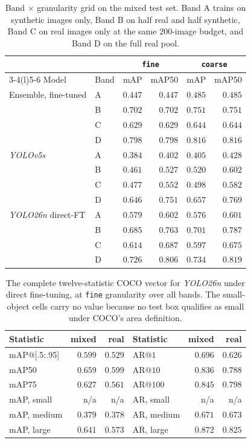 \begin{table}[htbp]
\centering
\caption[Band by granularity grid on the mixed test set]{Band $\times$ granularity grid on the mixed test set. Band A trains on synthetic images only, Band B on half real and half synthetic, Band C on real images only at the same $200$-image budget, and Band D on the full real pool.}
\label{tab:band-grid-mixed}
\small
\begin{tabular}{@{}llrrrr@{}}
\toprule
 & & \multicolumn{2}{c}{\texttt{fine}} & \multicolumn{2}{c}{\texttt{coarse}} \\
\cmidrule(l){3-4}\cmidrule(l){5-6}
Model & Band & mAP & mAP50 & mAP & mAP50 \\
\midrule
Ensemble, fine-tuned & A & $0.447$ & $0.447$ & $0.485$ & $0.485$ \\
 & B & $0.702$ & $0.702$ & $0.751$ & $0.751$ \\
 & C & $0.629$ & $0.629$ & $0.644$ & $0.644$ \\
 & D & $0.798$ & $0.798$ & $0.816$ & $0.816$ \\
\midrule
\textit{YOLOv5s} & A & $0.384$ & $0.402$ & $0.405$ & $0.428$ \\
 & B & $0.461$ & $0.527$ & $0.520$ & $0.602$ \\
 & C & $0.477$ & $0.552$ & $0.498$ & $0.582$ \\
 & D & $0.646$ & $0.751$ & $0.657$ & $0.769$ \\
\midrule
\textit{YOLO26n} direct-FT & A & $0.579$ & $0.602$ & $0.576$ & $0.601$ \\
 & B & $0.685$ & $0.763$ & $0.701$ & $0.787$ \\
 & C & $0.614$ & $0.687$ & $0.597$ & $0.675$ \\
 & D & $0.726$ & $0.806$ & $0.734$ & $0.819$ \\
\bottomrule
\end{tabular}
\end{table}


\begin{table}[htbp]
\centering
\caption[Full COCO vector for the primary detector]{The complete twelve-statistic COCO vector for \textit{YOLO26n} under direct fine-tuning, at \texttt{fine} granularity over all bands. The small-object cells carry no value because no test box qualifies as small under COCO's area definition.}
\label{tab:headline-coco12}
\begin{tabular}{@{}lrrlrr@{}}
\toprule
Statistic & mixed & real & Statistic & mixed & real \\
\midrule
mAP@[.5:.95] & $0.599$ & $0.529$ & AR@$1$ & $0.696$ & $0.626$ \\
mAP50 & $0.659$ & $0.599$ & AR@$10$ & $0.836$ & $0.788$ \\
mAP75 & $0.627$ & $0.561$ & AR@$100$ & $0.845$ & $0.798$ \\
mAP, small & n/a & n/a & AR, small & n/a & n/a \\
mAP, medium & $0.379$ & $0.378$ & AR, medium & $0.671$ & $0.673$ \\
mAP, large & $0.641$ & $0.573$ & AR, large & $0.872$ & $0.825$ \\
\bottomrule
\end{tabular}
\end{table}

